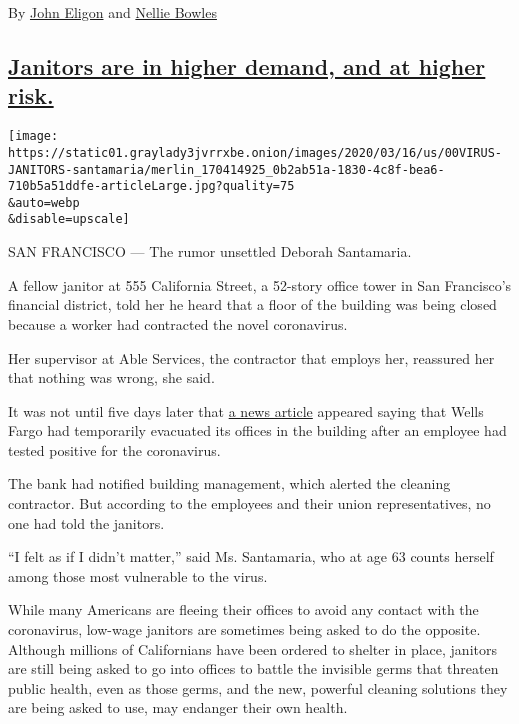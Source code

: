 By \href{https://www.nytimes3xbfgragh.onion/by/john-eligon}{John Eligon}
and \href{https://www.nytimes3xbfgragh.onion/by/nellie-bowles}{Nellie
Bowles}

\hypertarget{janitors-are-in-higher-demand-and-at-higher-risk}{%
\subsection{\texorpdfstring{\protect\hyperlink{janitors-are-in-higher-demand-and-at-higher-risk}{Janitors
are in higher demand, and at higher
risk.}}{Janitors are in higher demand, and at higher risk.}}\label{janitors-are-in-higher-demand-and-at-higher-risk}}

\texttt{[image: https://static01.graylady3jvrrxbe.onion/images/2020/03/16/us/00VIRUS-JANITORS-santamaria/merlin\_170414925\_0b2ab51a-1830-4c8f-bea6-710b5a51ddfe-articleLarge.jpg?quality=75\\\&auto=webp\\\&disable=upscale]}

SAN FRANCISCO --- The rumor unsettled Deborah Santamaria.

A fellow janitor at 555 California Street, a 52-story office tower in
San Francisco's financial district, told her he heard that a floor of
the building was being closed because a worker had contracted the novel
coronavirus.

Her supervisor at Able Services, the contractor that employs her,
reassured her that nothing was wrong, she said.

It was not until five days later that
\href{https://www.bloomberg.com/news/articles/2020-03-09/wells-fargo-worker-in-california-tests-positive-for-coronavirus}{a
news article} appeared saying that Wells Fargo had temporarily evacuated
its offices in the building after an employee had tested positive for
the coronavirus.

The bank had notified building management, which alerted the cleaning
contractor. But according to the employees and their union
representatives, no one had told the janitors.

``I felt as if I didn't matter,'' said Ms. Santamaria, who at age 63
counts herself among those most vulnerable to the virus.

While many Americans are fleeing their offices to avoid any contact with
the coronavirus, low-wage janitors are sometimes being asked to do the
opposite. Although millions of Californians have been ordered to shelter
in place, janitors are still being asked to go into offices to battle
the invisible germs that threaten public health, even as those germs,
and the new, powerful cleaning solutions they are being asked to use,
may endanger their own health.

